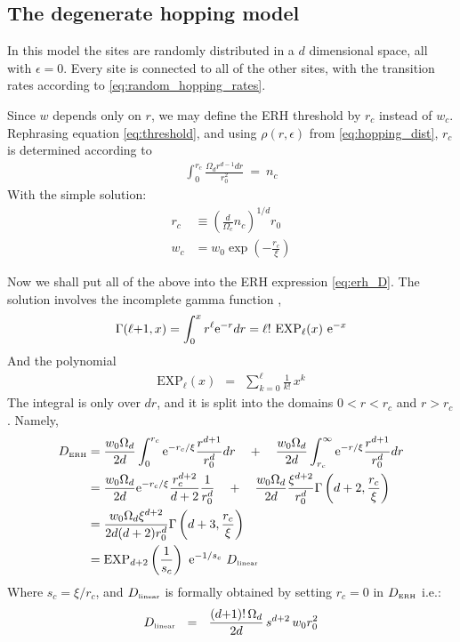 \subsection{The degenerate hopping model}

In this model the sites are randomly distributed in a $d$ dimensional 
space, all with $\epsilon=0$. Every site is connected to all of the other
sites, with the transition rates according to \ref{eq:random_hopping_rates}.

Since $w$ depends only on $r$, we may define the ERH threshold by
$r_c$ instead of $w_c$. Rephrasing equation \ref{eq:threshold}, and 
using $\rho(r,\epsilon)$ from \ref{eq:hopping_dist}, $r_c$ is determined according to
%
\begin{align}
\int_0^{r_c} \frac{\Omega_d r^{d-1} dr}{r_0^2} \ = \  n_c 
\end{align}
%
With the simple solution:
%
\begin{align}
r_c  &\equiv \left(\frac{d}{\Omega_c}n_c\right)^{1/d}  r_0 \\
w_c &= w_0\exp\left(-\frac{r_c}{\xi}\right) 
\end{align}
%

Now we shall put all of the above into the ERH expression \ref{eq:erh_D}.
The solution involves the incomplete gamma function \cite{_nist_????},
%
\begin{align}
\Gamma(\ell{+}1,x) = \int_0^x r^{\ell} \mbox{e}^{-r} dr = 
\ell! \ \mbox{EXP}_{\ell}(x)  \ \mbox{e}^{-x}
\end{align}
%
And the polynomial
%
\begin{align}\label{eq:EXP}
\mathrm{EXP}_{\ell}(x) \ \ = \ \ \sum_{k=0}^{\ell} \frac{1}{k!} \, x^k
\end{align}
% 
The integral is only over $dr$, and it is split  
into the domains ${0<r<r_c}$ and ${r>r_c}$. 
Namely, 
%
\begin{align}
D_{\tbox{ERH}} &= 
\frac{w_0\Omega_d}{2d}\int_0^{r_c} \eexp{-r_c / \xi} \frac{r^{d+1}}{r_0^d} dr 
\nonumber 
\quad+\quad \frac{w_0\Omega_d}{2d}\int_{r_c}^\infty \eexp{-r / \xi} \frac{r^{d+1}}{r_0^d} dr 
\nonumber \\
&= \frac{w_0\Omega_d}{2d} \eexp{-r_c / \xi} \frac{r_c^{d+2}}{d+2} \frac{1}{r_0^d}
\nonumber 
\quad+\quad \frac{w_0\Omega_d}{2d} \frac{\xi^{d+2}}{r_0^d} \Gamma\left(d+2,\frac{r_c}{\xi}\right)
\nonumber \\
&= \frac{w_0\Omega_d \xi^{d+2}}{2d(d+2)r_0^d}\Gamma\left(d+3,\frac{r_c}{\xi}\right)\\
&= \mathrm{EXP}_{d{+}2}\left(\frac{1}{s_c}\right)  \  \eexp{-1/s_c}  \ D_{\tbox{linear}}
\end{align}
%
Where $s_c=\xi/r_c$, and $D_{\mbox{\tiny linear}}$ is formally obtained by setting
$r_c=0$ in $D_{\mbox{\tiny ERH}}$  i.e.:
%
\begin{align}\label{eq:D_linear}
D_{\mbox{\tiny linear}} \ \ = \ \  
\frac{(d{+}1)!\,\Omega_d}{2d} \, s^{d{+}2} \, w_0 r_0^2
\end{align}

